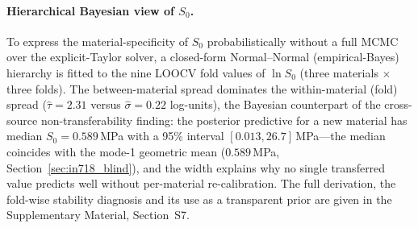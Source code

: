 \documentclass[twocolumn]{sagej}
\begin{document}
\paragraph{Hierarchical Bayesian view of $S_0$.}
To express the material-specificity of $S_0$ probabilistically without a full MCMC over the explicit-Taylor solver, a closed-form Normal--Normal (empirical-Bayes) hierarchy is fitted to the nine LOOCV fold values of $\ln S_0$ (three materials $\times$ three folds). The between-material spread dominates the within-material (fold) spread ($\hat\tau = 2.31$ versus $\hat\sigma = 0.22$ log-units), the Bayesian counterpart of the cross-source non-transferability finding: the posterior predictive for a new material has median $S_0 = 0.589$\,MPa with a 95\% interval $[0.013, 26.7]$\,MPa---the median coincides with the mode-1 geometric mean ($0.589$\,MPa, Section~\ref{sec:in718_blind}), and the width explains why no single transferred value predicts well without per-material re-calibration. The full derivation, the fold-wise stability diagnosis and its use as a transparent prior are given in the Supplementary Material, Section~S7.
\end{document}
